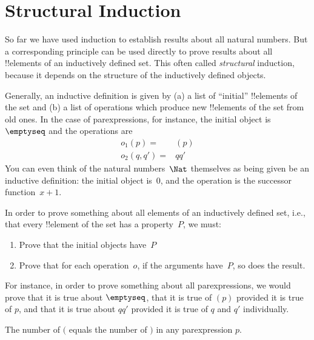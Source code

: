 \documentclass[../../../include/open-logic-section]{subfiles}
\begin{document}
\section{Structural Induction}

So far we have used induction to establish results about all natural
numbers. But a corresponding principle can be used directly to prove
results about all !!{element}s of an inductively defined set.  This
often called \emph{structural} induction, because it depends on the
structure of the inductively defined objects.

Generally, an inductive definition is given by (a) a list of
``initial'' !!{element}s of the set and (b) a list of operations which
produce new !!{element}s of the set from old ones. In the case of
parexpressions, for instance, the initial object is~$\emptyseq$ and
the operations are
\begin{align*}
  o_1(p) = & (p) \\
  o_2(q, q') = & qq'
\end{align*}
You can even think of the natural numbers~$\Nat$ themselves as being
given be an inductive definition: the initial object is~$0$, and the
operation is the successor function~$x + 1$.

In order to prove something about all elements of an inductively
defined set, i.e., that every !!{element} of the set has a
property~$P$, we must:
\begin{enumerate}
\item Prove that the initial objects have~$P$
\item Prove that for each operation~$o$, if the arguments have~$P$,
  so does the result.
\end{enumerate}
For instance, in order to prove something about all parexpressions, we
would prove that it is true about $\emptyseq$, that it is true of
$(p)$ provided it is true of $p$, and that it is true about $qq'$
provided it is true of $q$ and $q'$ individually.

\begin{prop}
  The number of $($ equals the number of $)$ in any parexpression $p$.
\end{prop}
\end{document}

